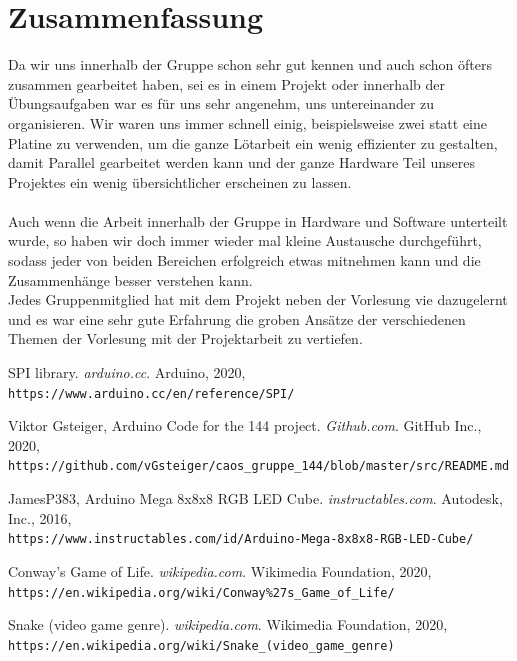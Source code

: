 \documentclass[12pt,a4paper]{article}
\begin{document}
\section{Zusammenfassung}

Da wir uns innerhalb der Gruppe schon sehr gut kennen und auch schon öfters zusammen gearbeitet haben, sei es in einem Projekt oder  innerhalb der Übungsaufgaben war es für uns sehr angenehm, uns untereinander zu organisieren. Wir waren uns immer schnell einig, beispielsweise zwei statt eine Platine zu verwenden, um die ganze Lötarbeit ein wenig effizienter zu gestalten, damit Parallel gearbeitet werden kann und der ganze Hardware Teil unseres Projektes ein wenig übersichtlicher erscheinen zu lassen. \\\\
Auch wenn die Arbeit innerhalb der Gruppe in Hardware und Software unterteilt wurde, so haben wir doch immer wieder mal kleine Austausche durchgeführt, sodass jeder von beiden Bereichen erfolgreich etwas mitnehmen kann und die Zusammenhänge besser verstehen kann.\\

Jedes Gruppenmitglied hat mit dem Projekt neben der Vorlesung vie dazugelernt und es war eine sehr gute Erfahrung die groben Ansätze
der verschiedenen Themen der Vorlesung mit der Projektarbeit zu vertiefen.


\newpage

\begin{thebibliography}{9}
	SPI library.
	\textit{arduino.cc}.
	Arduino, 2020,
	\\\texttt{https://www.arduino.cc/en/reference/SPI/}
	
	Viktor Gsteiger, Arduino Code for the 144 project.
	\textit{Github.com}.
	GitHub Inc., 2020,
	\\\texttt{https://github.com/vGsteiger/caos\_gruppe\_144/blob/master/src/README.md}
	
	JamesP383, Arduino Mega 8x8x8 RGB LED Cube. 
	\textit{instructables.com}. 
	Autodesk, Inc., 2016,
	\\\texttt{https://www.instructables.com/id/Arduino-Mega-8x8x8-RGB-LED-Cube/}
	
	Conway's Game of Life. 
	\textit{wikipedia.com}. 
	Wikimedia Foundation, 2020,
	\\\texttt{https://en.wikipedia.org/wiki/Conway\%27s\_Game\_of\_Life/}
	
	Snake (video game genre). 
	\textit{wikipedia.com}. 
	Wikimedia Foundation, 2020,
	\\\texttt{https://en.wikipedia.org/wiki/Snake\_(video\_game\_genre)}
	
	
\end{thebibliography}
\end{document}
